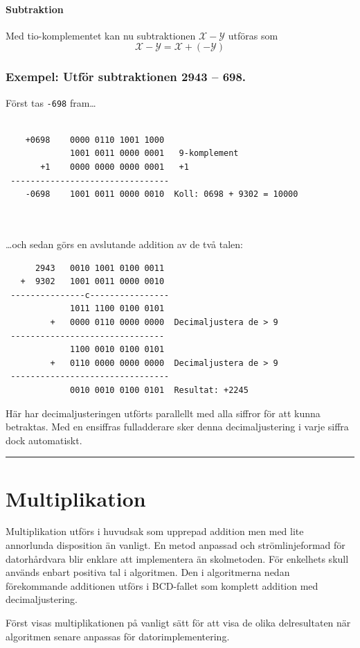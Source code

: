 \documentclass[oneside,10pt,a4paper,swedish]{scrbook}
\newcommand{\startex}[1]{\subsubsection{Exempel: #1}}
\newcommand{\slutex}{\vspace{-8mm}\begin{flushright} \rule{1ex}{1ex} \end{flushright}}
\newcommand{\asm}[1]{\texttt{#1}}
\begin{document}
\paragraph{Subtraktion}
Med tio-komplementet kan nu subtraktionen $\mathcal{X}-\mathcal{Y}$  utföras som  \[\mathcal{X}-\mathcal{Y}=\mathcal{X}+(-\mathcal{Y})\]

\startex{Utför subtraktionen 2943 -- 698.}
Först tas \asm{-698} fram\ldots
\begin{center}
\begin{lstlisting}
  
    +0698    0000 0110 1001 1000
             1001 0011 0000 0001   9-komplement
       +1    0000 0000 0000 0001   +1
 --------------------------------
    -0698    1001 0011 0000 0010  Koll: 0698 + 9302 = 10000
 
 
 \end{lstlisting}
\end{center}
\ldots och sedan görs en avslutande addition av de två talen:
\begin{center}
\begin{lstlisting}
      2943   0010 1001 0100 0011
   +  9302   1001 0011 0000 0010 
 ---------------c----------------
             1011 1100 0100 0101
         +   0000 0110 0000 0000  Decimaljustera de > 9
 -------------------------------
             1100 0010 0100 0101           
         +   0110 0000 0000 0000  Decimaljustera de > 9
 --------------------------------
             0010 0010 0100 0101  Resultat: +2245
\end{lstlisting}
\end{center}

Här har decimaljusteringen utförts parallellt med alla siffror för att kunna betraktas. Med en ensiffras fulladderare sker denna decimaljustering i varje siffra dock automatiskt.

\slutex


\section{Multiplikation} Multiplikation utförs i huvudsak som upprepad addition men med lite annorlunda disposition än vanligt. En metod anpassad och strömlinjeformad för datorhårdvara blir enklare att implementera än skolmetoden. För enkelhets skull används enbart positiva tal i algoritmen. Den i algoritmerna nedan förekommande additionen utförs i BCD-fallet som komplett addition med decimaljustering.

Först visas multiplikationen på vanligt sätt för att visa de olika del\-resultaten när algoritmen senare anpassas för datorimplementering.
\end{document}
